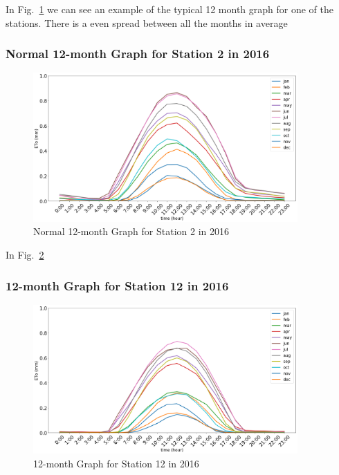 \begin{frame}
	In Fig.~\ref{fig:2-2016} we can see an example of the typical 12 month graph for one of the stations. There is a even spread between all the months in average
\end{frame}

\begin{frame}
\frametitle{Normal 12-month Graph for Station 2 in 2016}
\centering
\begin{figure}
	\includegraphics[width=0.9\textwidth]{images/2-2016.png}
	\caption{Normal 12-month Graph for Station 2 in 2016}\label{fig:2-2016}
\end{figure}
\end{frame}

\begin{frame}
	In Fig.~\ref{fig:12-2016} 
\end{frame}

\begin{frame}
\frametitle{12-month Graph for Station 12 in 2016}
\centering
\begin{figure}
\includegraphics[width=0.9\textwidth]{images/12-2016.png}
\caption{12-month Graph for Station 12 in 2016}\label{fig:12-2016}
\end{figure}
\end{frame}

